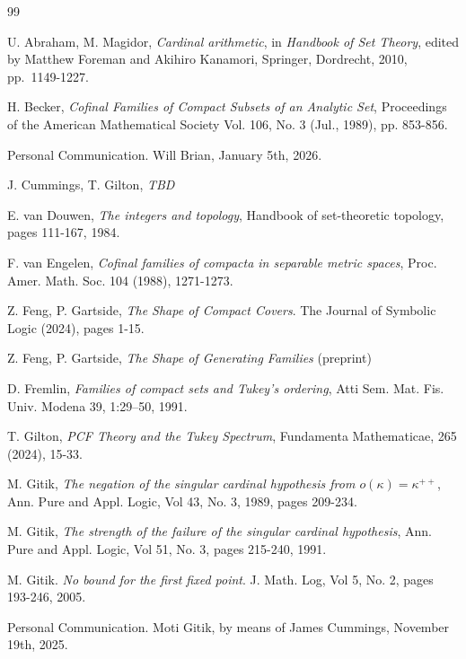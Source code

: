 \documentclass{article}
\begin{document}
\begin{thebibliography}{99}

U. Abraham, M. Magidor, \emph{Cardinal arithmetic}, in \emph{Handbook of Set Theory}, edited by Matthew Foreman and Akihiro Kanamori, Springer, Dordrecht, 2010, pp.~1149-1227.


 H. Becker, \emph{Cofinal Families of Compact Subsets of an Analytic Set}, Proceedings of the American Mathematical Society
Vol. 106, No. 3 (Jul., 1989), pp. 853-856.

 Personal Communication. Will Brian,  January 5th, 2026.


 J. Cummings, T. Gilton, \emph{TBD}


 E. van Douwen, \emph{The integers and topology}, Handbook of set-theoretic
topology, pages 111-167, 1984.

 F. van Engelen, \emph{Cofinal families of compacta in separable metric spaces}, Proc. Amer.
Math. Soc. 104 (1988), 1271-1273.

 Z. Feng,  P. Gartside,  \emph{The Shape of Compact Covers}. The Journal of Symbolic Logic (2024), pages 1-15. %

 Z. Feng, P. Gartside, \emph{The Shape of Generating Families} (preprint)

 D. Fremlin, \emph{Families of compact sets and Tukey’s ordering}, Atti Sem. Mat.
Fis. Univ. Modena 39, 1:29–50, 1991.

 T. Gilton, 
\emph{\textsc{PCF} Theory and the Tukey Spectrum}, 
Fundamenta Mathematicae, 265 (2024), 15-33. 

 M. Gitik, \emph{The negation of the singular cardinal hypothesis from $o(\kappa)=\kappa^{++}$}, Ann. Pure and Appl. Logic, Vol 43, No. 3, 1989, pages 209-234.

 M. Gitik, \emph{The strength of the failure of the singular cardinal hypothesis}, Ann. Pure and Appl. Logic, Vol 51, No. 3, pages 215-240, 1991.


M. Gitik. \emph{No bound for the first fixed point}. J. Math. Log, Vol 5, No. 2, pages 193-246, 2005.


Personal Communication. Moti Gitik, by means of James Cummings, November 19th, 2025.



\end{thebibliography}
\end{document}
